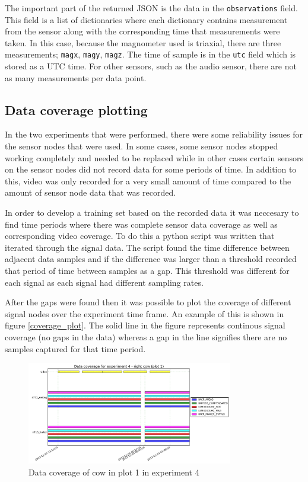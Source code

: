 The important part of the returned JSON is the data in the \texttt{observations} field. This field is a list of dictionaries where each dictionary contains measurement from the sensor along with the corresponding time that measurements were taken. In this case, because the magnometer used is triaxial, there are three measurements; \texttt{magx}, \texttt{magy}, \texttt{magz}. The time of sample is in the \texttt{utc} field which is stored as a UTC time. For other sensors, such as the audio sensor, there are not as many measurements per data point. 

\subsection{Data coverage plotting}

In the two experiments that were performed, there were some reliability issues for the sensor nodes that were used. In some cases, some sensor nodes stopped working completely and needed to be replaced while in other cases certain sensors on the sensor nodes did not record data for some periods of time. In addition to this, video was only recorded for a very small amount of time compared to the amount of sensor node data that was recorded. 

In order to develop a training set based on the recorded data it was neccesary to find time periods where there was complete sensor data coverage as well as corresponding video coverage. To do this a python script was written that iterated through the signal data. The script found the time difference between adjacent data samples and if the difference was larger than a threshold recorded that period of time between samples as a gap. This threshold was different for each signal as each signal had different sampling rates. 

After the gaps were found then it was possible to plot the coverage of different signal nodes over the experiment time frame. An example of this is shown in figure \ref{coverage_plot}. The solid line in the figure represents continous signal coverage (no gaps in the data) whereas a gap in the line signifies there are no samples captured for that time period. 

\begin{figure}[ht!]
\begin{center}
\leavevmode
\includegraphics[width=0.8\textwidth]{images/experiment4_coverage_zoomed.png}
\end{center}
\caption{Data coverage of cow in plot 1 in experiment 4}
\label{exp4overall}
\end{figure}

